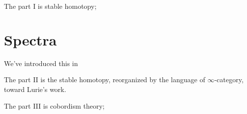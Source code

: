 \documentclass[Total.tex]{subfiles}
\begin{document}
	The part I is stable homotopy;
	
	\chapter{Spectra}
		We've introduced this in 
	
	\newpage The part II is the stable homotopy, reorganized by the language of $\infty$-category, toward Lurie's work.
	
	
	
	\newpage The part III is cobordism theory;
\end{document}
